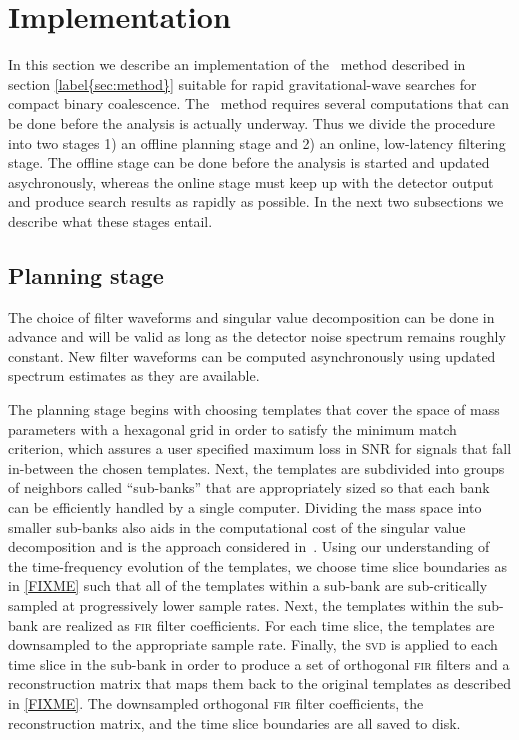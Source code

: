\section{Implementation}

In this section we describe an implementation of the \lloid\ method described
in section \ref{label{sec:method}} suitable for rapid gravitational-wave
searches for compact binary coalescence.  The \lloid\ method requires several
computations that can be done before the analysis is actually underway.  Thus
we divide the procedure into two stages 1) an offline planning stage and 2) an
online, low-latency filtering stage.  The offline stage can be done before the
analysis is started and updated asychronously, whereas the online stage must
keep up with the detector output and produce search results as rapidly as
possible.  In the next two subsections we describe what these stages entail.

\subsection{Planning stage}

The choice of filter waveforms and singular value decomposition can be done in
advance and will be valid as long as the detector noise spectrum remains
roughly constant.  New filter waveforms can be computed asynchronously using
updated spectrum estimates as they are available. 

The planning stage begins with choosing templates that cover the space of mass
parameters with a hexagonal grid \cite{PhysRevD.76.102004} in order to satisfy
the minimum match criterion, which assures a user specified maximum loss in SNR
for signals that fall in-between the chosen templates.  Next, the templates are
subdivided into groups of neighbors called ``sub-banks'' that are appropriately
sized so that each bank can be efficiently handled by a single computer.
Dividing the mass space into smaller sub-banks also aids in the computational
cost of the singular value decomposition and is the approach considered
in~\cite{Cannon:2010p10398}.  Using our understanding of the time-frequency
evolution of the templates, we choose time slice boundaries as in \eqref{FIXME}
such that all of the templates within a sub-bank are sub-critically sampled at
progressively lower sample rates.  Next, the templates within the sub-bank are
realized as \textsc{fir} filter coefficients.  For each time slice, the
templates are downsampled to the appropriate sample rate.  Finally, the
\textsc{svd} is applied to each time slice in the sub-bank in order to produce
a set of orthogonal \textsc{fir} filters and a reconstruction matrix that maps
them back to the original templates as described in \eqref{FIXME}.  The
downsampled orthogonal \textsc{fir} filter coefficients, the reconstruction
matrix, and the time slice boundaries are all saved to disk.


